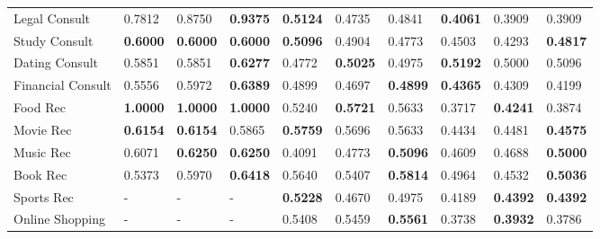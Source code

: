 \begin{table}[h]
\begin{tabular}{p{2.5cm}M{1.1cm}M{1.1cm}M{1.2cm} | M{1.1cm}M{1.1cm}M{1.2cm}| M{1.1cm}M{1.1cm}M{1.2cm}}
Legal Consult    & 0.7812 & 0.8750 & \textbf{0.9375} & \textbf{0.5124} & 0.4735 & 0.4841 & \textbf{0.4061} & 0.3909 & 0.3909 \\
Study Consult    & \textbf{0.6000} & \textbf{0.6000} & \textbf{0.6000} & \textbf{0.5096} & 0.4904 & 0.4773 & 0.4503 & 0.4293 & \textbf{0.4817} \\
Dating Consult   & 0.5851 & 0.5851 & \textbf{0.6277} & 0.4772 & \textbf{0.5025} & 0.4975 & \textbf{0.5192} & 0.5000 & 0.5096 \\
Financial Consult& 0.5556 & 0.5972 & \textbf{0.6389} & 0.4899 & 0.4697 & \textbf{0.4899} & \textbf{0.4365} & 0.4309 & 0.4199 \\
\midrule
Food Rec         & \textbf{1.0000} & \textbf{1.0000} & \textbf{1.0000} & 0.5240 & \textbf{0.5721} & 0.5633 & 0.3717 & \textbf{0.4241} & 0.3874 \\
Movie Rec        & \textbf{0.6154} & \textbf{0.6154} & 0.5865 & \textbf{0.5759} & 0.5696 & 0.5633 & 0.4434 & 0.4481 & \textbf{0.4575} \\
Music Rec        & 0.6071 & \textbf{0.6250} & \textbf{0.6250} & 0.4091 & 0.4773 & \textbf{0.5096} & 0.4609 & 0.4688 & \textbf{0.5000 }\\
Book Rec         & 0.5373 & 0.5970 & \textbf{0.6418} & 0.5640 & 0.5407 & \textbf{0.5814} & 0.4964 & 0.4532 & \textbf{0.5036} \\
Sports Rec       &   -    &   -    &   -    & \textbf{0.5228} & 0.4670 & 0.4975 & 0.4189 & \textbf{0.4392} & \textbf{0.4392} \\
Online Shopping  &   -    &   -    &   -    & 0.5408 & 0.5459 & \textbf{0.5561} & 0.3738 & \textbf{0.3932} & 0.3786 \\
\bottomrule
\end{tabular}
\vspace{-5pt}
\end{table}



